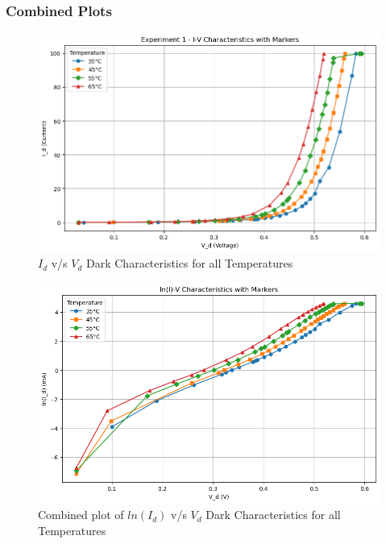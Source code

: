 \documentclass[a4paper]{article}
\begin{document}
\newpage

\subsubsection{Combined Plots}

\begin{figure}[h!]
    \centering
    \includegraphics[width=1\linewidth]{Lab_5/Post_Lab/Exp_1_Summarised.png}
    \caption{$I_d$ v/s $V_d$ Dark Characteristics for all Temperatures}
\end{figure}

\begin{figure}[h!]
    \centering
    \includegraphics[width=1\linewidth]{Lab_5/Post_Lab/ln_I_d_vs_V_d_Exp_1_Combined.png}
    \caption{Combined plot of $ln(I_d)$ v/s $V_d$ Dark Characteristics for all Temperatures}
\end{figure}
\end{document}
